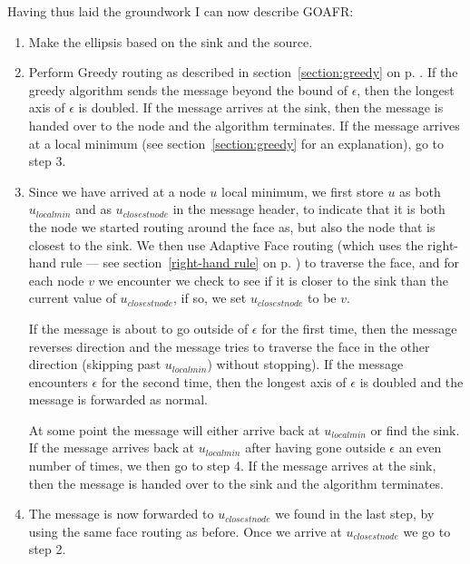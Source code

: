 Having thus laid the groundwork I can now describe GOAFR:
\begin{enumerate}
\item Make the ellipsis based on the sink and the source.
\item Perform Greedy routing as described in section~\ref{section:greedy} on p. \pageref{section:greedy}. If the greedy algorithm sends the message beyond the bound of $\epsilon$, then the longest axis of $\epsilon$ is doubled. If the message arrives at the sink, then the message is handed over to the node and the algorithm terminates. If the message arrives at a local minimum (see section~\ref{section:greedy} for an explanation), go to step 3.
\item Since we have arrived at a node $u$ local minimum, we first store $u$ as both $u_{local min}$ and as $u_{closest node}$ in the message header, to indicate that it is both the node we started routing around the face as, but also the node that is closest to the sink. We then use Adaptive Face routing (which uses the right-hand rule --- see section~\ref{right-hand rule} on p. \pageref{right-hand rule}) to traverse the face, and for each node $v$ we encounter we check to see if it is closer to the sink than the current value of $u_{closest node}$, if so, we set $u_{closest node}$ to be $v$. 

If the message is about to go outside of $\epsilon$ for the first time, then the message reverses direction and the message tries to traverse the face in the other direction (skipping past $u_{local min}$) without stopping). If the message encounters $\epsilon$ for the second time, then the longest axis of $\epsilon$ is doubled and the message is forwarded as normal.

At some point the message will either arrive back at $u_{local min}$ or find the sink. If the message arrives back at $u_{local min}$ after having gone outside $\epsilon$ an even number of times, we then go to step 4. If the message arrives at the sink, then the message is handed over to the sink and the algorithm terminates.
\item The message is now forwarded to $u_{closest node}$ we found in the last step, by using the same face routing as before. Once we arrive at $u_{closest node}$ we go to step 2.
\end{enumerate}

